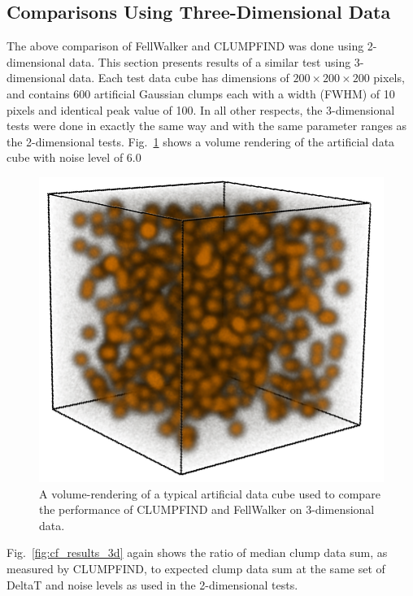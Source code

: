 \documentclass[final,authoryear,5p,times,twocolumn]{elsarticle}
\begin{document}
\subsection{Comparisons Using Three-Dimensional Data}

The above comparison of FellWalker and CLUMPFIND was done using
2-dimensional data. This section presents results of a similar test using
3-dimensional data. Each test data cube has dimensions of $200\times200\times200$
pixels, and contains 600 artificial Gaussian clumps each with a width
(FWHM) of 10 pixels and identical peak value of 100. In all other
respects, the 3-dimensional tests were done in exactly the same way and
with the same parameter ranges as the 2-dimensional tests.
Fig.~\ref{fig:true_6} shows a volume rendering of the artificial data
cube with noise level of 6.0

\begin{figure}
\includegraphics[width=\columnwidth]{true_6}
\caption{A volume-rendering of a typical artificial data cube used to
compare the performance of CLUMPFIND and FellWalker on 3-dimensional data.}
\label{fig:true_6}
\end{figure}

Fig.~\ref{fig:cf_results_3d} again shows the ratio of median clump data
sum, as measured by CLUMPFIND, to expected clump data sum at the same set
of DeltaT and noise levels as used in the 2-dimensional tests.
\end{document}
